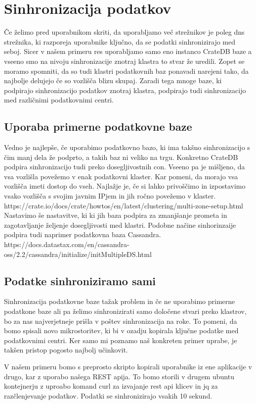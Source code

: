 \documentclass[a4paper, 12pt]{book}
\begin{document}
\section{Sinhronizacija podatkov}
Če želimo pred uporabnikom skriti, da uporabljamo več strežnikov je poleg dns strežnika, ki razporeja uporabnike ključno, da se podatki sinhronizirajo med seboj.
Sicer v našem primeru res uporabljamo samo eno instanco CrateDB baze a vseeno smo na nivoju sinhronizacije znotraj klastra to stvar že uredili. 
Zopet se moramo spomniti, da so tudi klastri podatkovnih baz ponavadi narejeni tako, da najbolje delujejo če so vozlišča blizu skupaj.
Zaradi tega mnoge baze, ki podpirajo sinhronizacijo podatkov znotraj klastra, podpirajo tudi sinhronizacijo med različnimi podatkovnimi centri.
\subsection{Uporaba primerne podatkovne baze}
Vedno je najlepše, če uporabimo podatkovno bazo, ki ima takšno sinhronizacijo s čim manj dela že podprto, a takih baz ni veliko na trgu.
Konkretno CrateDB podpira sinhronizacijo tudi preko dosegljivostnih con.
Vseeno pa je mišljeno, da vsa vozlišla povežemo v enak podatkovni klaster.
Kar pomeni, da morajo vsa vozlišča imeti dostop do vseh.
Najlažje je, če si lahko privoščimo in izpostavimo vsako vozlišča s svojim javnim IPjem in jih ročno povežemo v klaster.
https://crate.io/docs/crate/howtos/en/latest/clustering/multi-zone-setup.html
Nastavimo še nastavitve, ki ki jih baza podpira za zmanjšanje prometa in zagotavljanje željenje dosegljivosti med klastri.
Podobne načine sinhorinzaije podpira tudi naprimer podatkovna baza Cassandra.
https://docs.datastax.com/en/cassandra-oss/2.2/cassandra/initialize/initMultipleDS.html
\subsection{Podatke sinhroniziramo sami}
Sinhronizacija podatkovne baze tažak problem in če ne uporabimo primerne podatkone baze ali pa želimo sinhronizirati samo določene stvari preko klastrov, bo za nas najverjetneje prišla v poštev sinhronizacija na roke. To pomeni, da bomo spisali novo mikrostoritev, ki bi v ozadju kopirala ključne podatke med podatkovnimi centri.
Ker samo mi poznamo naš konkreten primer uprabe, je takšen pristop pogosto najbolj učinkovit.

V našem primeru bomo s preprosto skripto kopirali uporabnike iz ene aplikacije v drugo, kar z uporabo našega REST apija.
To bomo storili v drugem ubuntu kontejnerju z uproabo komand curl za izvajanje rest api klicev in jq za razčlenjevanje podatkov.
Podatki se sinhronizirajo vsakih 10 sekund.
\end{document}

